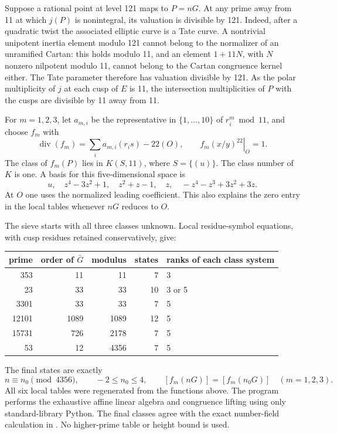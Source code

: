 \documentclass[11pt]{article}
\begin{document}
Suppose a rational point at level 121 maps to \(P=nG\). At any prime
away from 11 at which \(j(P)\) is nonintegral, its valuation is divisible
by 121. Indeed, after a quadratic twist the associated elliptic curve
is a Tate curve. A nontrivial unipotent inertia element modulo 121
cannot belong to the normalizer of an unramified Cartan: this holds
modulo 11, and an element \(1+11N\), with \(N\) nonzero nilpotent
modulo 11, cannot belong to the Cartan congruence kernel either.
The Tate parameter therefore has valuation divisible by 121.
As the polar multiplicity of \(j\) at each cusp of \(E\) is 11, the
intersection multiplicities of \(P\) with the cusps are divisible by 11
away from 11.

For \(m=1,2,3\), let \(a_{m,i}\) be the representative in
\(\{1,\ldots,10\}\) of \(r_i^m\bmod11\), and choose \(f_m\) with
\[
 \operatorname{div}(f_m)=\sum_i a_{m,i}(r_i s)-22(O),
 \qquad \left.f_m(x/y)^{22}\right|_O=1.
\]
The class of \(f_m(P)\) lies in \(K(S,11)\), where
\(S=\{(u)\}\). The class number of \(K\) is one. A basis for this
five-dimensional space is
\[
 u,\quad z^4-3z^2+1,\quad z^2+z-1,\quad z,
 \quad -z^4-z^3+3z^2+3z.
\]
At \(O\) one uses the normalized leading coefficient. This also explains
the zero entry in the local tables whenever \(nG\) reduces to \(O\).

The sieve starts with all three classes unknown. Local residue-symbol
equations, with cusp residues retained conservatively, give:
\begin{center}\begin{tabular}{rrrrl}\toprule
prime&order of \(\bar G\)&modulus&states&ranks of each class system\\\midrule
353&11&11&7&3\\
23&33&33&10&3 or 5\\
3301&33&33&7&5\\
12101&1089&1089&12&5\\
15731&726&2178&7&5\\
53&12&4356&7&5\\\bottomrule
\end{tabular}\end{center}
The final states are exactly
\begin{equation}\label{eq:sieve}
 n\equiv n_0\pmod{4356},\qquad -2\le n_0\le4,
 \qquad [f_m(nG)]=[f_m(n_0G)]\quad(m=1,2,3).
\end{equation}
All six local tables were regenerated from the functions above.
The program  performs the exhaustive affine
linear algebra and congruence lifting using only standard-library Python.
The final classes agree with the exact number-field calculation in
. No higher-prime table or height bound is used.
\end{document}
